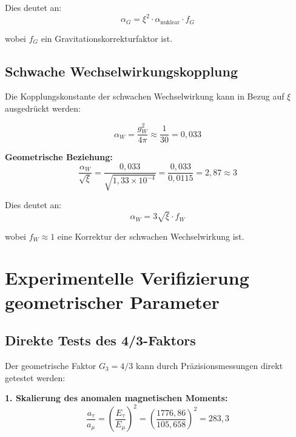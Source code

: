 \documentclass[12pt,a4paper]{report}
\begin{document}
	Dies deutet an:
	\begin{equation}
		\alpha_G = \xi^2 \cdot \alpha_{\text{nuklear}} \cdot f_G
	\end{equation}
	
	wobei $f_G$ ein Gravitationskorrekturfaktor ist.
	
	\subsection{Schwache Wechselwirkungskopplung}
	\label{subsec:weak_coupling}
	
	Die Kopplungskonstante der schwachen Wechselwirkung kann in Bezug auf $\xi$ ausgedrückt werden:
	
	\begin{equation}
		\alpha_W = \frac{g_W^2}{4\pi} \approx \frac{1}{30} = 0,033
	\end{equation}
	
	\textbf{Geometrische Beziehung:}
	\begin{equation}
		\frac{\alpha_W}{\sqrt{\xi}} = \frac{0,033}{\sqrt{1,33 \times 10^{-4}}} = \frac{0,033}{0,0115} = 2,87 \approx 3
	\end{equation}
	
	Dies deutet an:
	\begin{equation}
		\alpha_W = 3\sqrt{\xi} \cdot f_W
	\end{equation}
	
	wobei $f_W \approx 1$ eine Korrektur der schwachen Wechselwirkung ist.
	
	\section{Experimentelle Verifizierung geometrischer Parameter}
	\label{sec:experimental_verification}
	
	\subsection{Direkte Tests des 4/3-Faktors}
	\label{subsec:direct_tests}
	
	Der geometrische Faktor $G_3 = 4/3$ kann durch Präzisionsmessungen direkt getestet werden:
	
	\textbf{1. Skalierung des anomalen magnetischen Moments:}
	\begin{equation}
		\frac{a_\tau}{a_\mu} = \left(\frac{E_\tau}{E_\mu}\right)^2 = \left(\frac{1776,86}{105,658}\right)^2 = 283,3
	\end{equation}
	
\end{document}

